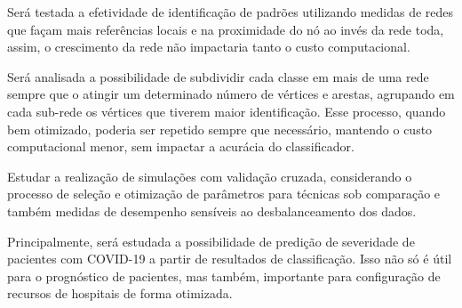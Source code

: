 \documentclass[
12pt,        %
oneside,     %
a4paper,     %
english,       %
brazil        %
%
%
]{ppgca}
\begin{document}
Será testada a efetividade de identificação de padrões utilizando medidas de redes que façam mais referências locais e na proximidade do nó ao invés da rede toda, assim, o crescimento da rede não impactaria tanto o custo computacional.

Será analisada a possibilidade de subdividir cada classe em mais de uma rede sempre que o atingir um determinado número de vértices e arestas, agrupando em cada sub-rede os vértices que tiverem maior identificação. Esse processo, quando bem otimizado, poderia ser repetido sempre que necessário, mantendo o custo computacional menor, sem impactar a acurácia do classificador.

Estudar a realização de simulações com validação cruzada, considerando o processo de seleção e otimização de parâmetros para técnicas sob comparação e também medidas de desempenho sensíveis ao desbalanceamento dos dados.

Principalmente, será estudada a possibilidade de predição de severidade de pacientes com COVID-19 a partir de resultados de classificação. Isso não só é útil para o prognóstico de pacientes, mas também, importante para configuração de recursos de hospitais de forma otimizada.



%
%




\end{document}
